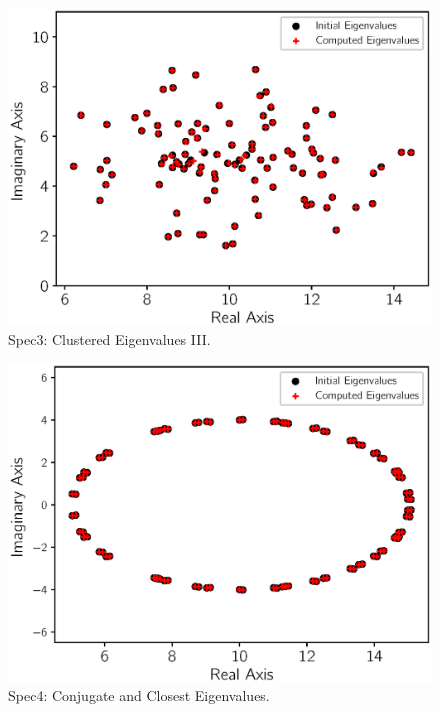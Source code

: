 \begin{figure}[htbp]
	\centering
	\includegraphics[width=5.8in]{fig/matgen/vector1.eps}
	\caption{Spec3: Clustered Eigenvalues III.}
	\label{fig_third_case}
\end{figure}


\begin{figure}[htbp]
	\centering
	\includegraphics[width=5.8in]{fig/matgen/vector5.eps}
	\caption{Spec4: Conjugate and Closest Eigenvalues.}
	\label{fig_forth_case}
\end{figure}

